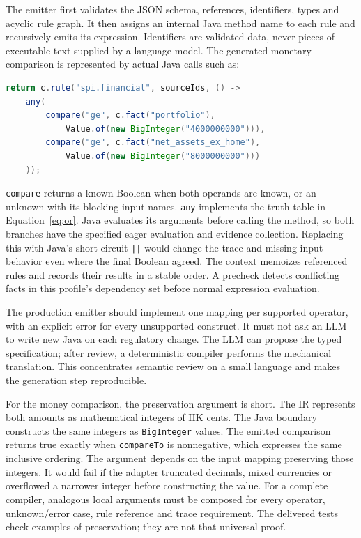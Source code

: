\documentclass[12pt,a4paper,oneside,openany]{book}
\begin{document}
The emitter first validates the JSON schema, references, identifiers, types and
acyclic rule graph. It then assigns an internal Java method name to each rule
and recursively emits its expression. Identifiers are validated data, never
pieces of executable text supplied by a language model. The generated monetary
comparison is represented by actual Java calls such as:
\begin{lstlisting}[language=Java,caption={The generated financial method's essential body. The complete class is built and tested in the supplied example.}]
return c.rule("spi.financial", sourceIds, () ->
    any(
        compare("ge", c.fact("portfolio"),
            Value.of(new BigInteger("4000000000"))),
        compare("ge", c.fact("net_assets_ex_home"),
            Value.of(new BigInteger("8000000000")))
    ));
\end{lstlisting}
\texttt{compare} returns a known Boolean when both operands are known, or an
unknown with its blocking input names. \texttt{any} implements the truth table
in Equation~\eqref{eq:or}. Java evaluates its arguments before calling the
method, so both branches have the specified eager evaluation and evidence
collection. Replacing this with Java's short-circuit \texttt{||} would change
the trace and missing-input behavior even where the final Boolean agreed.
The context memoizes referenced rules and records their results in a stable
order. A precheck detects conflicting facts in this profile's dependency set
before normal expression evaluation.

The production emitter should implement one mapping per supported operator,
with an explicit error for every unsupported construct. It must not ask an LLM
to write new Java on each regulatory change. The LLM can propose the typed
specification; after review, a deterministic compiler performs the mechanical
translation. This concentrates semantic review on a small language and makes
the generation step reproducible.

For the money comparison, the preservation argument is short. The IR represents
both amounts as mathematical integers of HK cents. The Java boundary constructs
the same integers as \texttt{BigInteger} values. The emitted comparison returns
true exactly when \texttt{compareTo} is nonnegative, which expresses the same
inclusive ordering. The argument depends on the input mapping preserving those
integers. It would fail if the adapter truncated decimals, mixed currencies or
overflowed a narrower integer before constructing the value. For a complete
compiler, analogous local arguments must be composed for every operator,
unknown/error case, rule reference and trace requirement. The delivered tests
check examples of preservation; they are not that universal proof.
\end{document}

